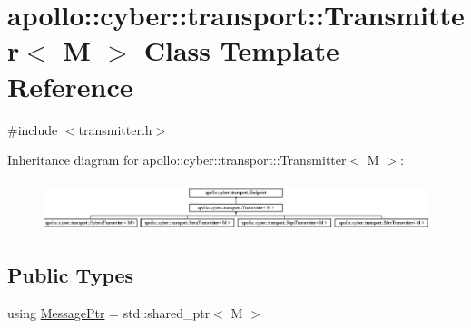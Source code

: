 \hypertarget{classapollo_1_1cyber_1_1transport_1_1Transmitter}{\section{apollo\-:\-:cyber\-:\-:transport\-:\-:Transmitter$<$ M $>$ Class Template Reference}
\label{classapollo_1_1cyber_1_1transport_1_1Transmitter}
}


{\ttfamily \#include $<$transmitter.\-h$>$}

Inheritance diagram for apollo\-:\-:cyber\-:\-:transport\-:\-:Transmitter$<$ M $>$\-:\begin{figure}[H]
\begin{center}
\leavevmode
\includegraphics[height=1.448276cm]{classapollo_1_1cyber_1_1transport_1_1Transmitter}
\end{center}
\end{figure}
\subsection*{Public Types}
\begin{DoxyCompactItemize}
\item 
using \hyperlink{classapollo_1_1cyber_1_1transport_1_1Transmitter_a1c068aab2db2d0a5ba7a26ed228b7c65}{Message\-Ptr} = std\-::shared\-\_\-ptr$<$ M $>$
\end{DoxyCompactItemize}
